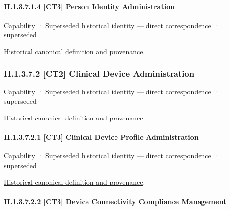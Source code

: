 \paragraph*{II.1.3.7.1.4 [CT3] Person Identity Administration}
\label{navigation:II.1.3.7.1.4}

\label{element:7550fd5b17e643118fa76d2616e1ba20}
{\small Capability · Superseded historical identity — direct correspondence · superseded}\par
\href{../../../../continuum/strategy/capability/7550fd5b17e643118fa76d2616e1ba20.md}{Historical canonical definition and provenance}.\par
\subsubsection*{II.1.3.7.2 [CT2] Clinical Device Administration}
\label{navigation:II.1.3.7.2}

\label{element:3792be10541e4d68b3f740b1ba964966}
{\small Capability · Superseded historical identity — direct correspondence · superseded}\par
\href{../../../../continuum/strategy/capability/3792be10541e4d68b3f740b1ba964966.md}{Historical canonical definition and provenance}.\par
\paragraph*{II.1.3.7.2.1 [CT3] Clinical Device Profile Administration}
\label{navigation:II.1.3.7.2.1}

\label{element:e8c72952da144d6883caba7fd2afb88d}
{\small Capability · Superseded historical identity — direct correspondence · superseded}\par
\href{../../../../continuum/strategy/capability/e8c72952da144d6883caba7fd2afb88d.md}{Historical canonical definition and provenance}.\par
\paragraph*{II.1.3.7.2.2 [CT3] Device Connectivity Compliance Management}
\label{navigation:II.1.3.7.2.2}

